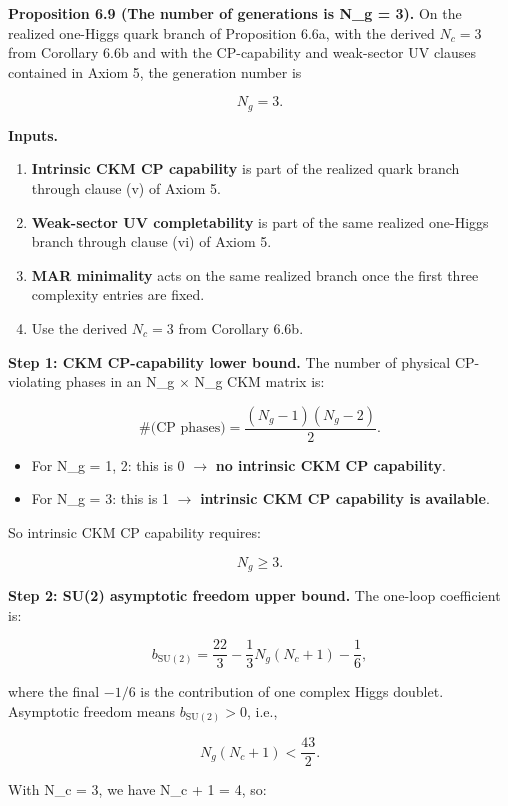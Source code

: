 \textbf{Proposition 6.9 (The number of generations is N\_g = 3).} On the realized one-Higgs quark branch of Proposition 6.6a, with the derived \(N_c=3\) from Corollary 6.6b and with the CP-capability and weak-sector UV clauses contained in Axiom 5, the generation number is

\[
N_g = 3.
\]

\textbf{Inputs.}

\begin{enumerate}
\def\labelenumi{\arabic{enumi}.}
\tightlist
\item
  \textbf{Intrinsic CKM CP capability} is part of the realized quark branch through clause (v) of Axiom 5.
\item
  \textbf{Weak-sector UV completability} is part of the same realized one-Higgs branch through clause (vi) of Axiom 5.
\item
  \textbf{MAR minimality} acts on the same realized branch once the first three complexity entries are fixed.
\item
  Use the derived \(N_c = 3\) from Corollary 6.6b.
\end{enumerate}

\textbf{Step 1: CKM CP-capability lower bound.} The number of physical CP-violating phases in an N\_g \ensuremath{\times} N\_g CKM matrix is:

\[
\#\text{(CP phases)} = \frac{(N_g - 1)(N_g - 2)}{2}.
\]

\begin{itemize}
\tightlist
\item
  For N\_g = 1, 2: this is 0 \ensuremath{\to} \textbf{no intrinsic CKM CP capability}.
\item
  For N\_g = 3: this is 1 \ensuremath{\to} \textbf{intrinsic CKM CP capability is available}.
\end{itemize}

So intrinsic CKM CP capability requires:

\[
N_g \ge 3.
\]

\textbf{Step 2: SU(2) asymptotic freedom upper bound.} The one-loop coefficient is:

\[
b_{\mathrm{SU}(2)} = \frac{22}{3} - \frac{1}{3}N_g(N_c + 1) - \frac{1}{6},
\]

where the final \(-1/6\) is the contribution of one complex Higgs doublet. Asymptotic freedom means \(b_{\mathrm{SU}(2)} > 0\), i.e.,

\[
N_g(N_c + 1) < \frac{43}{2}.
\]

With N\_c = 3, we have N\_c + 1 = 4, so:

